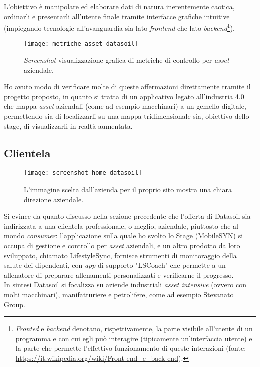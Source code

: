 L'obiettivo è manipolare ed elaborare dati di natura inerentemente caotica, ordinarli e presentarli all'utente finale tramite interfacce grafiche intuitive (impiegando tecnologie all'avanguardia sia lato \textit{frontend} che lato \textit{backend}\footnote{\textit{Fronted} e \textit{backend} denotano, rispettivamente, la parte visibile all'utente di un programma e con cui egli può interagire (tipicamente un'interfaccia utente) e la parte che permette l'effettivo funzionamento di queste interazioni (fonte: \url{https://it.wikipedia.org/wiki/Front-end_e_back-end}).}).
\begin{figure}[H]
    \centering
    \texttt{[image: metriche\_asset\_datasoil]}
    \caption[Metriche di controllo \textit{asset} aziendale]{\textit{Screenshot} visualizzazione grafica di metriche di controllo per \textit{asset} aziendale.\footnotemark}
\end{figure}
Ho avuto modo di verificare molte di queste affermazioni direttamente tramite il progetto proposto, in quanto si tratta di un applicativo legato all'industria 4.0 che mappa \textit{asset} aziendali (come ad esempio macchinari) a un gemello digitale, permettendo sia di localizzarli su una mappa tridimensionale sia, obiettivo dello stage, di visualizzarli in realtà aumentata.

\subsection{Clientela}
\begin{figure}[H]
    \centering
    \texttt{[image: screenshot\_home\_datasoil]}
    \caption[Immagine \textit{home page} Datasoil]{L'immagine scelta dall'azienda per il proprio sito mostra una chiara direzione aziendale.\footnotemark}
\end{figure}
Si evince da quanto discusso nella sezione precedente che l'offerta di Datasoil sia indirizzata a una clientela professionale, o meglio, aziendale, piuttosto che al mondo \textit{consumer}: 
l'applicazione sulla quale ho svolto lo Stage (MobileSYN) si occupa di gestione e controllo per \textit{asset} aziendali, e un altro prodotto da loro sviluppato, chiamato LifestyleSync, fornisce strumenti di monitoraggio della salute dei dipendenti, con \textit{app} di supporto "LSCoach" che permette a un allenatore di preparare allenamenti personalizzati e verificarne il progresso.\\
In sintesi Datasoil si focalizza su aziende industriali \textit{asset intensive} (ovvero con molti macchinari), manifatturiere e petrolifere, come ad esempio \href{https://www.stevanatogroup.com/it/}{Stevanato Group}.

